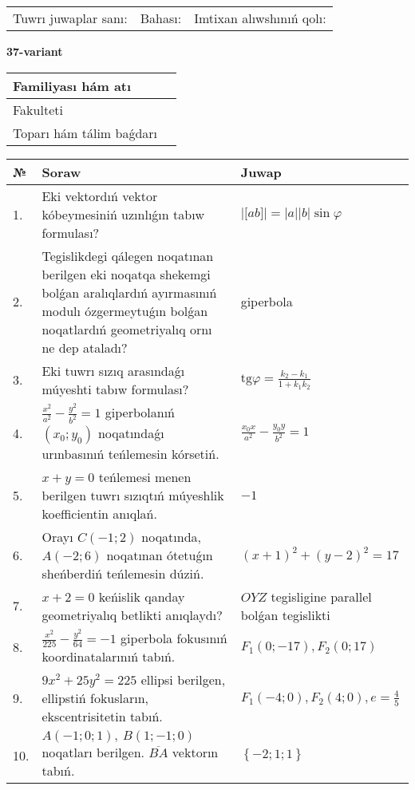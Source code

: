 \documentclass{article}
\begin{document}
\vspace{1cm}

\begin{tabular}{lll}
Tuwrı juwaplar sanı: \underline{\hspace{1.5cm}} & 
Bahası: \underline{\hspace{1.5cm}} & 
Imtixan alıwshınıń qolı: \underline{\hspace{2cm}} \\
\end{tabular}

\egroup

\newpage


\textbf{37-variant}\\

\bgroup
\def\arraystretch{1.6} %

\begin{tabular}{|m{5.7cm}|m{9.5cm}|}
\hline
Familiyası hám atı & \\
\hline
Fakulteti  & \\
\hline
Toparı hám tálim baǵdarı  & \\
\hline
\end{tabular}

\vspace{1cm}

\begin{tabular}{|m{0.7cm}|m{10cm}|m{4cm}|}
\hline
№ & Soraw & Juwap \\
\hline
1. & Eki vektordıń vektor kóbeymesiniń uzınlıǵın tabıw formulası? & $\left| \lbrack ab\rbrack \right|=|a||b|\sin\varphi$ \\
\hline
2. & Tegislikdegi qálegen noqatınan berilgen eki noqatqa shekemgi bolǵan aralıqlardıń ayırmasınıń modulı ózgermeytuǵın bolǵan noqatlardıń geometriyalıq ornı ne dep ataladı? & giperbola \\
\hline
3. & Eki tuwrı sızıq arasındaǵı múyeshti tabıw formulası? & $\text{tg}\varphi=\frac{k_2-k_1}{1+k_1k_2}$ \\
\hline
4. & $\frac{x^2}{a^2}-\frac{y^2}{b^2}=1$ giperbolanıń $(x_0;y_0)$ noqatındaǵı urınbasınıń teńlemesin kórsetiń. & $\frac{x_0x}{a^2}-\frac{y_0y}{b^2}=1$ \\
\hline
5. & $x+y=0$ teńlemesi menen berilgen tuwrı sızıqtıń múyeshlik koefficientin anıqlań. & $- 1$ \\
\hline
6. & Orayı $C (-1;2)$ noqatında, $A (-2;6 )$ noqatınan ótetuǵın sheńberdiń teńlemesin dúziń. & $(x+1)^{2}+(y-2)^{2}=17$ \\
\hline
7. & $x+2=0$ keńislik qanday geometriyalıq betlikti anıqlaydı? &  $OYZ$ tegisligine parallel bolǵan tegislikti \\
\hline
8. & $\frac{x^{2}}{225}-\frac{y^{2}}{64}=-1$ giperbola fokusınıń koordinatalarınıń tabıń. & $F_{1}(0;-17), F_{2}(0;17)$ \\
\hline
9. & $9x^{2}+25y^{2}=225$ ellipsi berilgen, ellipstiń fokusların, ekscentrisitetin tabıń. & $F_1\left(-4;0 \right) , F_2\left( 4;0 \right) , e = \frac{4}{5}$ \\
\hline
10. & $A (-1;0;1),\ B (1;-1;0)$ noqatları berilgen. $\overline{BA}$ vektorın tabıń. & $\left\{ - 2;1;1 \right\}$ \\
\hline
\end{tabular}
\end{document}
